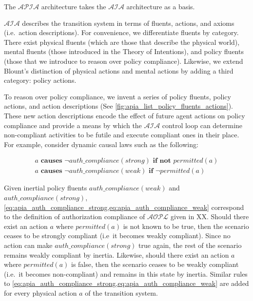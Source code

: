 The $\mathcal{APIA}$ architecture takes the $\mathcal{AIA}$ architecture as a basis.

$\mathcal{AIA}$ describes the transition system in terms of fluents, actions, and axioms (i.e.~action descriptions).
For convenience, we differentiate fluents by category.
There exist physical fluents (which are those that describe the physical world), mental fluents (those introduced in the Theory of Intentions), and policy fluents (those that we introduce to reason over policy compliance).
Likewise, we extend Blount's distinction of physical actions and mental actions by adding a third category: policy actions.

To reason over policy compliance, we invent a series of policy fluents, policy actions, and action descriptions (See \cref{fig:apia_list_policy_fluents_actions}).
These new action descriptions encode the effect of future agent actions on policy compliance and provide a means by which the $\mathcal{AIA}$ control loop can determine non-compliant activities to be futile and execute compliant ones in their place.
For example, consider dynamic causal laws such as the following:

\begin{gather}
    a \textbf{ causes } \neg auth\_compliance(strong) \textbf{ if not } permitted(a)
        \label{eq:apia_auth_compliance_strong} \\
    a \textbf{ causes } \neg auth\_compliance(weak) \textbf{ if } \neg permitted(a)
        \label{eq:apia_auth_compliance_weak}
\end{gather}

Given inertial policy fluents $auth\_compliance(weak)$ and $auth\_compliance(strong)$, \cref{eq:apia_auth_compliance_strong,eq:apia_auth_compliance_weak} correspond to the definition of authorization compliance of $\mathcal{AOPL}$ given in XX.
Should there exist an action $a$ where $permitted(a)$ is not known to be true, then the scenario ceases to be strongly compliant (i.e~it becomes weakly compliant).
Since no action can make $auth\_compliance(strong)$ true again, the rest of the scenario remains weakly compliant by inertia.
Likewise, should there exist an action $a$ where $permitted(a)$ is false, then the scenario ceases to be weakly compliant (i.e.~it becomes non-compliant) and remains in this state by inertia.
Similar rules to \cref{eq:apia_auth_compliance_strong,eq:apia_auth_compliance_weak} are added for every physical action $a$ of the transition system.

